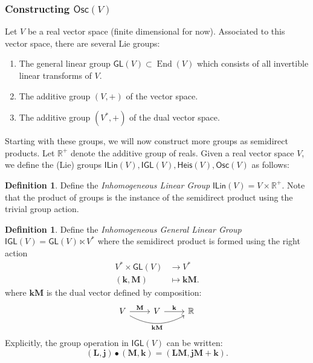 \documentclass[12pt]{article}
\newcounter{counter}
\theoremstyle{definition}
\newtheorem{dfn}[counter]{Definition}
\theoremstyle{plain}
\newcommand{\End}{\mathop{\mathrm{End}}}
\begin{document}
\subsubsection{Constructing $\mathsf{Osc}(V)$}

Let \(V\) be a real vector space (finite dimensional for now).   Associated to this vector space, there are several Lie groups:
\begin{enumerate}
    \item The general linear group \(\mathsf{GL}(V) \subset \End(V)\) which consists of all invertible linear transforms of \(V\).
    \item The additive group \((V,+)\) of the vector space.
    \item The additive group \((V^*, +)\) of the dual vector space.    
\end{enumerate}

Starting with these groups, we will now construct more groups as semidirect products.
Let $\mathbb{R}^+$ denote the additive group of reals. Given a real vector space \(V\), we define the (Lie) groups \(\mathsf{ILin}(V), \mathsf{IGL}(V), \mathsf{Heis}(V), \mathsf{Osc}(V)\) as follows:\\

\begin{dfn}
    Define the \emph{Inhomogeneous Linear Group} \(\mathsf{ILin}(V) = V \times \mathbb{R}^+\).  Note that the product of groups is the instance of the semidirect product using the trivial group action.\\
\end{dfn}

\begin{dfn}
    Define the \emph{Inhomogeneous General Linear Group} \(\mathsf{IGL}(V) = \mathsf{GL}(V) \ltimes V^*\) where the semidirect product is formed using the right action
    \begin{align}
        V^* \times \mathsf{GL}(V) &\to V^* \\
        (\mathbf{k},\mathbf{M}) &\mapsto \mathbf{kM}.
    \end{align}
    where $\mathbf{kM}$ is the dual vector defined by composition:
    \begin{equation} \label{dualmatrixcomposite}
        \begin{tikzcd}
            V \ar[r, "\mathbf{M}"] \ar[rr, bend right, "\mathbf{kM}"'] & V \ar[r, "\mathbf{k}"] & \mathbb{R}
        \end{tikzcd}
    \end{equation}  
    Explicitly, the group operation in $\mathsf{IGL}(V)$ can be written:
    \begin{equation}
        (\mathbf{L}, \mathbf{j}) \bullet  (\mathbf{M}, \mathbf{k})
        = (\mathbf{LM}, \mathbf{jM} + \mathbf{k}).
    \end{equation}
\end{dfn}
\end{document}

